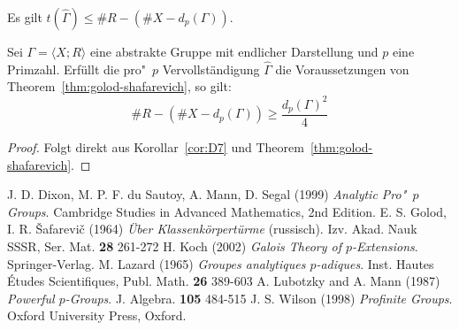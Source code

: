 \documentclass[11pt,a4paper,openany]{memoir}
\begin{document}
\begin{corollary}\label{cor:D7}
Es gilt $t(\widehat{\Gamma})\leq \#R -(\#X-d_p(\Gamma))$.
\end{corollary}

\begin{theorem}
Sei $\Gamma=\langle X;R\rangle$ eine abstrakte Gruppe mit endlicher Darstellung und $p$ eine Primzahl. Erfüllt die pro"~$p$ Vervollständigung $\widehat{\Gamma}$ die Voraussetzungen von Theorem~\ref{thm:golod-shafarevich}, so gilt:
\[\#R -(\#X-d_p(\Gamma))\geq \frac{d_p(\Gamma)^2}{4} \]
\end{theorem}

\begin{proof}
Folgt direkt aus Korollar~\ref{cor:D7} und Theorem~\ref{thm:golod-shafarevich}.
\end{proof}
\fi

\begin{thebibliography}{99999999}

	J. D. Dixon, M. P. F. du Sautoy, A. Mann, D. Segal (1999)
	\textit{Analytic Pro"~$p$ Groups}.
	Cambridge Studies in Advanced Mathematics,
	2nd Edition.
	E. S. Golod, I. R. \v{S}afarevi\v{c} (1964)
	\textit{Über Klassenkörpertürme} (russisch). Izv. Akad. Nauk SSSR, Ser. Mat. \textbf{28} 261-272
	H. Koch (2002) \textit{Galois Theory of $p$-Extensions}. Springer-Verlag.
	M. Lazard (1965) \textit{Groupes analytiques $p$-adiques}. Inst. Hautes Études Scientifiques, Publ. Math. \textbf{26} 389-603
	A. Lubotzky and A. Mann (1987) \textit{Powerful $p$-Groups}. J. Algebra. \textbf{105} 484-515
	J. S. Wilson (1998) \textit{Profinite Groups}. Oxford University Press, Oxford.

\end{thebibliography}

\end{document}
